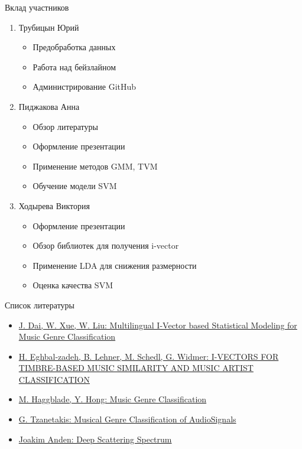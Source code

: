 \documentclass[xcolor=svgnames,handout]{beamer}
\begin{document}
\begin{frame}
  {Вклад участников}

  \begin{enumerate}
      \item Трубицын Юрий
      \begin{itemize}
      \item Предобработка данных
      \item Работа над бейзлайном
      \item Администрирование GitHub
      \end{itemize}
      \item Пиджакова Анна
      \begin{itemize}
      \item Обзор литературы
      \item Оформление презентации
      \item Применение методов GMM, TVM
      \item Обучение модели SVM
      \end{itemize}
      \item Ходырева Виктория
      \begin{itemize}
      \item Оформление презентации
      \item Обзор библиотек для получения i-vector
      \item Применение LDA для снижения размерности
      \item Оценка качества SVM
      \end{itemize}
  \end{enumerate}
 
 
\end{frame}

\begin{frame}
  {Список литературы}

  \begin{itemize}
  \item \href{https://www.isca-speech.org/archive/Interspeech_2017/pdfs/0074.PDF}{J. Dai, W. Xue, W. Liu: Multilingual I-Vector based Statistical Modeling for Music Genre Classification}
  \item \href{http://ismir2015.uma.es/articles/128\_Paper.pdf}{H. Eghbal-zadeh, B. Lehner, M. Schedl, G. Widmer: I-VECTORS FOR TIMBRE-BASED MUSIC SIMILARITY AND MUSIC ARTIST CLASSIFICATION}
  \item \href{http://cs229.stanford.edu/proj2011/HaggbladeHongKao-MusicGenreClassification.pdf}{M. Haggblade, Y. Hong: Music Genre Classification}
  \item \href{https://www.researchgate.net/publication/220656193_Musical_Genre_Classification_of_Audio_Signals}{G. Tzanetakis: Musical Genre Classification of AudioSignals}
  \item \href{https://arxiv.org/abs/1304.6763}{Joakim Anden: Deep Scattering Spectrum}
  \end{itemize}
  
\end{frame}
\end{document}
